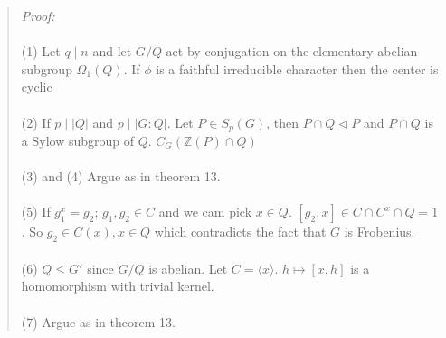 \begin{quote}
\emph{Proof:} 
\\
\\
(1) Let $q \mid n$ and let $G/Q$ act by conjugation on the elementary abelian subgroup $\Omega_1(Q)$.  If $\phi$ is a faithful
irreducible character then the center is cyclic
\\
\\
(2) If 
$p \mid |Q|$ and $p \mid |G:Q|$.  Let $P \in S_p(G)$, then $P \cap Q \lhd P$ and $P \cap Q$ is a Sylow subgroup of $Q$.
$C_G({\mathbb Z}(P) \cap Q)$
\\
\\
(3) and (4) Argue as in theorem 13.
\\
\\
(5) If $g_1^x=g_2$; $g_1, g_2 \in C$ and we cam pick $x \in Q$.  $[g_2,x] \in C \cap C^x \cap Q = 1$.  So $g_2 \in C(x), x \in Q$ which contradicts the
fact that $G$ is Frobenius.
\\
\\
(6) $Q \leq G'$ since $G/Q$ is abelian.  Let $C = \langle x \rangle$.  $h \mapsto [x, h]$ is a homomorphism with trivial kernel.
\\
\\
(7) Argue as in theorem 13.
\end{quote}
